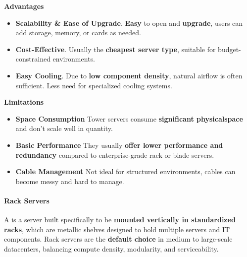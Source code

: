 \highspace
\begin{flushleft}
    \textcolor{Green3}{ \textbf{Advantages}}
\end{flushleft}
\begin{itemize}[label=\textcolor{Green3}{}]
    \item \textcolor{Green3}{\textbf{Scalability \& Ease of Upgrade}}. \textbf{Easy} to open and \textbf{upgrade}, users can add storage, memory, or cards as needed.
    \item \textcolor{Green3}{\textbf{Cost-Effective}}. Usually the \textbf{cheapest server type}, suitable for budget-constrained environments.
    \item \textcolor{Green3}{\textbf{Easy Cooling}}. Due to \textbf{low component density}, natural airflow is often sufficient. Less need for specialized cooling systems.
\end{itemize}

\highspace
\begin{flushleft}
    \textcolor{Red2}{ \textbf{Limitations}}
\end{flushleft}
\begin{itemize}[label=\textcolor{Red2}{}]
    \item \textcolor{Red2}{\textbf{Space Consumption}} Tower servers consume \textbf{significant physical\break space} and don't scale well in quantity.
    \item \textcolor{Red2}{\textbf{Basic Performance}} They usually \textbf{offer lower performance and redundancy} compared to enterprise-grade rack or blade servers.
    \item \textcolor{Red2}{\textbf{Cable Management}} Not ideal for structured environments, cables can become messy and hard to manage.
\end{itemize}

\newpage

\paragraph{Rack Servers}\label{paragraph: Rack Servers}

A  is a server built specifically to be \textbf{mounted vertically in standardized racks}, which are metallic shelves designed to hold multiple servers and IT components. Rack servers are the \textbf{default choice} in medium to large-scale datacenters, balancing compute density, modularity, and serviceability.


